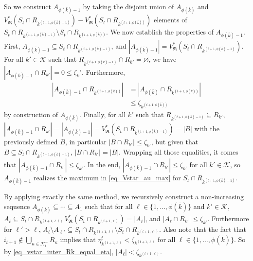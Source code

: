\documentclass[
  11pt,
  a4paper,
]{article}
\theoremstyle{definition}
\theoremstyle{plain}
\theoremstyle{plain}
\theoremstyle{plain}
\theoremstyle{definition}
\theoremstyle{remark}
\begin{document}
So we construct \(A_{\phi(\bar k)-1}\) by taking the disjoint union of
\(A_{\phi(\bar k)}\) and
\(V^*_{\mathfrak{R}}(S_t \cap R_{k^{(t+1,\phi(\bar k)-1)}}) - V^*_{\mathfrak{R}}(S_t \cap R_{k^{(t+1,\phi(\bar k))}})\)
elements of
\(S_t\cap R_{k^{(t+1,\phi(\bar k)-1)}} \setminus S_t\cap R_{k^{(t+1,\phi(\bar k))}}\).
We now establish the properties of \(A_{\phi(\bar k)-1}\). First,
\(A_{\phi(\bar k)-1}\subseteq S_t \cap R_{k^{(t+1,\phi(\bar k)-1)}}\),
and
\(|A_{\phi(\bar k)-1}|=V^*_{\mathfrak{R}}(S_t \cap R_{k^{(t+1,\phi(\bar k)-1)}})\).
For all \(k'\in\mathcal{K}\) such that
\(R_{k^{(t+1,\phi(\bar k)-1)}} \cap R_{k'}=\varnothing\), we have
\(|A_{\phi(\bar k)-1}\cap R_{k'}|=0\leq \zeta_k'\). Furthermore,
\begin{align*}
|A_{\phi(\bar k)-1}\cap R_{   k^{(t+1,\phi(\bar k))}   }|&=|A_{\phi(\bar k)}\cap R_{   k^{(t+1,\phi(\bar k))}   }|\\
&\leq \zeta_{ k^{(t+1,\phi(\bar k))} }
\end{align*} by construction of \(A_{\phi(\bar k)}\). Finally, for all
\(k'\) such that \(R_{k^{(t+1,\phi(\bar k)-1)}}\subseteq R_{k'}\),
\(|A_{\phi(\bar k)-1}\cap R_{k'}|=|A_{\phi(\bar k)-1}|=V^*_{\mathfrak{R}}(S_t \cap R_{k^{(t+1,\phi(\bar k)-1)}})=|B|\)
with the previously defined \(B\), in particular
\(|B\cap R_{k'}|\leq \zeta_{k'}\), but given that
\(B\subseteq S_t \cap R_{k^{(t+1,\phi(\bar k)-1)}}\),
\(|B\cap R_{k'}|=|B|\). Wrapping all those equalities, it comes that
\(|A_{\phi(\bar k)-1}\cap R_{k'}|\leq \zeta_{k'}\). In the end,
\(|A_{\phi(\bar k)-1}\cap R_{k'}|\leq \zeta_{k'}\) for all
\(k'\in\mathcal{K}\), so \(A_{\phi(\bar k)-1}\) realizes the maximum in
\eqref{eq_Vstar_au_max} for \(S_t \cap R_{k^{(t+1,\phi(\bar k)-1)}}\).

By applying exactly the same method, we recursively construct a
non-increasing sequence \(A_{\phi(\bar k)}\subseteq\dotsb\subseteq A_1\)
such that for all \(\ell\in\{1,\dotsc, \phi(\bar k)\}\) and
\(k'\in\mathcal{K}\), \(A_\ell\subseteq S_t\cap R_{k^{(t+1,\ell)}}\),
\(V^*_{\mathfrak{R}}(S_t\cap R_{k^{(t+1,\ell)}})=|A_\ell|\), and
\(|A_\ell\cap R_{k'}|\leq \zeta_{k'}\). Furthermore for \(\ell'>\ell\),
\(A_{\ell}\setminus A_{\ell'}\subseteq S_t\cap R_{k^{(t+1,\ell)}}\setminus S_t\cap R_{k^{(t+1,\ell')}}\).
Also note that the fact that
\(i_{t+1}\not\in\bigcup_{\kappa\in\mathcal{K}^-_{t}}R_{\kappa}\) implies
that \(\eta^t_{k^{(t+1,\ell)}}<\zeta_{k^{(t+1,\ell)}}\) for all
\(\ell\in\{1,\dotsc, \phi(\bar k)\}\). So by
\eqref{eq_vstar_inter_Rk_equal_eta},
\(|A_\ell|<\zeta_{k^{(t+1,\ell)}}\).
\end{document}
